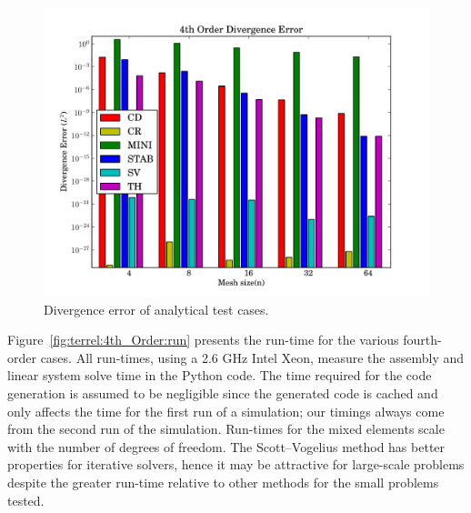 \begin{figure}
  \center\includegraphics[width=\largefig]{chapters/terrel/pdf/div_4.pdf}
  \caption{Divergence error of analytical test cases.}
  \label{fig:terrel:4th_Order:div}
\end{figure}

Figure~\ref{fig:terrel:4th_Order:run} presents the run-time for the
various fourth-order cases.  All run-times, using a 2.6 GHz Intel
Xeon, measure the assembly and linear system solve time in the Python
code. The time required for the code generation is assumed to be
negligible since the generated code is cached and only affects the
time for the first run of a simulation; our timings always come from
the second run of the simulation.  Run-times for the mixed elements
scale with the number of degrees of freedom. The Scott--Vogelius
method has better properties for iterative solvers, hence it may be
attractive for large-scale problems despite the greater run-time
relative to other methods for the small problems tested.

